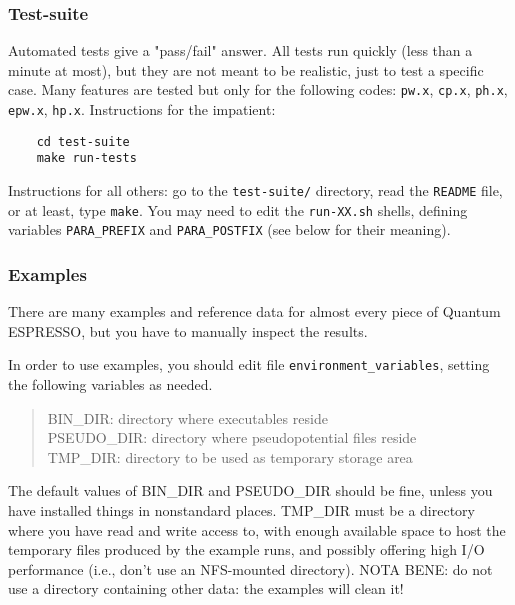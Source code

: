 \documentclass[12pt,a4paper]{article}
\def\qe{{\sc Quantum ESPRESSO}}
\def\pwx{\texttt{pw.x}}
\def\cpx{\texttt{cp.x}}
\def\phx{\texttt{ph.x}}
\def\epwx{\texttt{epw.x}}
\def\make{\texttt{make}}
\begin{document}
\subsubsection{Test-suite}
Automated tests give a "pass/fail" answer. All tests run quickly
(less than a minute at most), but they are not meant to be realistic,
just to test a specific case. Many features are tested but only for
the following codes: \pwx, \cpx, \phx, \epwx, \texttt{hp.x}.
Instructions for the impatient:
\begin{verbatim}
    cd test-suite
    make run-tests
\end{verbatim}
Instructions for all others: go to the \texttt{test-suite/} directory,
read the \texttt{README} file, or at least, type \make. You may need
to edit the \texttt{run-XX.sh} shells, defining variables
\texttt{PARA\_PREFIX} and \texttt{PARA\_POSTFIX} (see below for their
meaning).

\subsubsection{Examples}
There are many examples and reference data for almost every piece of \qe,
but you have to manually inspect the results.

In order to use examples, you should edit file \texttt{environment\_variables},
setting the following variables as needed.
\begin{quote}
   BIN\_DIR: directory where executables reside\\
   PSEUDO\_DIR: directory where pseudopotential files reside\\
   TMP\_DIR: directory to be used as temporary storage area
\end{quote}
The default values of BIN\_DIR and PSEUDO\_DIR should be fine,
unless you have installed things in nonstandard places. TMP\_DIR
must be a directory where you have read and write access to, with
enough available space to host the temporary files produced by the
example runs, and possibly offering high I/O performance (i.e., don't
use an NFS-mounted directory). NOTA BENE: do not use a
directory containing other data: the examples will clean it!
\end{document}
